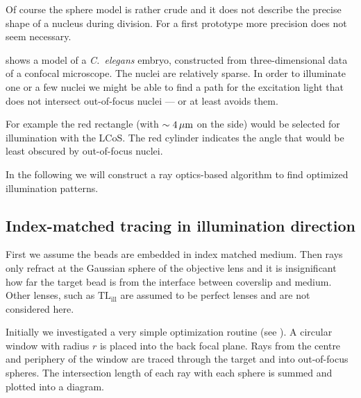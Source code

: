 Of course the sphere model is rather crude and it does not describe
the precise shape of a nucleus during division. For a first prototype
more precision does not seem necessary. 

 shows a model of a \emph{C.~elegans} embryo,
constructed from three-dimensional data of a confocal microscope. The
nuclei are relatively sparse. In order to illuminate one or a few
nuclei we might be able to find a path for the excitation light that
does not intersect out-of-focus nuclei --- or at least avoids them. 

For example the red rectangle (with $\sim\unit[4]{\mu m}$ on the side)
would be selected for illumination with the LCoS. The red cylinder
indicates the angle that would be least obscured by out-of-focus
nuclei.

In the following we will construct a ray optics-based algorithm to
find optimized illumination patterns.


\subsection{Index-matched tracing in illumination direction}

First we assume the beads are embedded in index matched medium. Then
rays only refract at the Gaussian sphere of the objective lens and it
is insignificant how far the target bead is from the interface between
coverslip and medium. Other lenses, such as $\textrm{TL}_\textrm{ill}$
are assumed to be perfect lenses and are not considered here.

Initially we investigated a very simple optimization routine (see
). A circular
window with radius $r$ is placed into the back focal plane. Rays from
the centre and periphery of the window are traced through the target
and into out-of-focus spheres. The intersection length of each ray
with each sphere is summed and plotted into a diagram.

